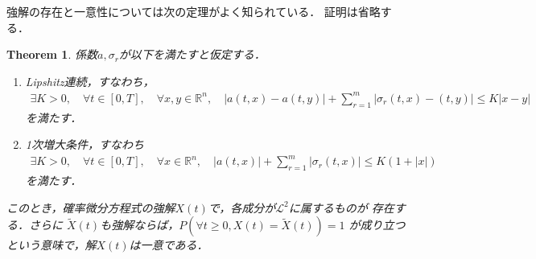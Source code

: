 \documentclass[dvipdfmx,autodetect-engine]{jsarticle}
\newtheorem{theorem}{Theorem}[section]
\theoremstyle{remark}
\theoremstyle{definition}
\newcommand{\R}{\mathbb{R}}
\newcommand{\abs}[1]{\left\lvert#1\right\rvert}
\begin{document}
強解の存在と一意性については次の定理がよく知られている．
証明は省略する．


\begin{theorem}
    係数$a,\sigma_{r}$が以下を満たすと仮定する．
    \begin{enumerate}
        \item Lipshitz連続，すなわち，
        \begin{align}
            \exists K>0,\quad \forall t \in [0,T],\quad \forall x,y \in \R^{n},\quad
            \abs{a(t,x)-a(t,y)} + \sum_{r=1}^{m} \abs{\sigma_{r}(t,x) - (t,y)} 
            \leq K\abs{x-y}
        \end{align}
        を満たす．
        \item 1次増大条件，すなわち
        \begin{align}
            \exists K>0,\quad \forall t \in [0,T],\quad \forall x\in \R^{n},\quad
            \abs{a(t,x)} + \sum_{r=1}^{m} \abs{\sigma_{r}(t,x)} \leq K(1+\abs{x})
        \end{align}
        を満たす．
    \end{enumerate}
    このとき，確率微分方程式の強解$X(t)$で，各成分が$\mathcal{L}^2$に属するものが
    存在する．さらに
    $\tilde{X}(t)$も強解ならば，$P(\forall t \geq 0,X(t)=\tilde{X}(t))=1$
    が成り立つという意味で，解$X(t)$は一意である．
\end{theorem}
\end{document}
